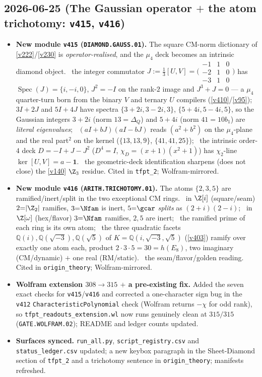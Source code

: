 \subsection*{2026-06-25 (The Gaussian operator $+$ the atom trichotomy: \texttt{v415}, \texttt{v416})}
\begin{itemize}
\item \textbf{New module \texttt{v415} (\texttt{DIAMOND.GAUSS.01}).} The square CM-norm dictionary of
\vref{v222}/\vref{v230} is \emph{operator-realised}, and the $\mu_4$ deck becomes an intrinsic diamond
object. \mE\ the integer commutator $J:=\tfrac13[U,V]=\big(\begin{smallmatrix}-1&1&0\\-2&1&0\\-3&1&0\end{smallmatrix}\big)$
has $\operatorname{Spec}(J)=\{i,-i,0\}$, $J^2=-I$ on the rank-$2$ image and $J^3+J=0$ --- a $\mu_4$
quarter-turn born from the binary $V$ and ternary $U$ compilers (\vref{v410}/\vref{v95}); \mE\ $3I+2J$ and
$5I+4J$ have spectra $\{3{+}2i,3{-}2i,3\}$, $\{5{+}4i,5{-}4i,5\}$, so the Gaussian integers $3{+}2i$ (norm
$13{=}\Delta_Q$) and $5{+}4i$ (norm $41{=}10b_1$) are \emph{literal eigenvalues}; \mE\ $(aI{+}bJ)(aI{-}bJ)$
reads $(a^2{+}b^2)$ on the $\mu_4$-plane and the real part$^2$ on the kernel ($\{13,13,9\}$, $\{41,41,25\}$);
\mE\ the intrinsic order-$4$ deck $D=-I+J-J^2$ ($D^4=I$, $\chi_D=(x{+}1)(x^2{+}1)$) has $\chi_2$-line
$\ker[U,V]=a-\mathbf 1$. \mC\ the geometric-deck identification sharpens (does not close) the \vref{v140}
$\Z_3$ residue. Cited in \texttt{tfpt\_2}; Wolfram-mirrored.
\item \textbf{New module \texttt{v416} (\texttt{ARITH.TRICHOTOMY.01}).} The atoms $\{2,3,5\}$ are
ramified/inert/split in the two exceptional CM rings. \mE\ in $\Z[i]$ (square/seam) $2{=}|\Z_2|$ ramifies,
$3{=}\Nfam$ is inert, $5{=}\gcar$ \emph{splits} as $(2{+}i)(2{-}i)$; \mE\ in $\Z[\omega]$ (hex/flavor)
$3{=}\Nfam$ ramifies, $2,5$ are inert; \mE\ the ramified prime of each ring is its own atom; \mE\ the three
quadratic facets $\mathbb Q(i),\mathbb Q(\sqrt{-3}),\mathbb Q(\sqrt5)$ of $K=\mathbb Q(i,\sqrt{-3},\sqrt5)$
(\vref{v403}) ramify over exactly one atom each, product $2\cdot3\cdot5=30=h(E_8)$, two imaginary
(CM/dynamic) $+$ one real (RM/static). \mC\ the seam/flavor/golden reading. Cited in
\texttt{origin\_theory}; Wolfram-mirrored.
\item \textbf{Wolfram extension $308\to315$ $+$ a pre-existing fix.} Added the seven exact checks for
\texttt{v415}/\texttt{v416} and corrected a one-character sign bug in the \texttt{v412}
\texttt{CharacteristicPolynomial} check (Wolfram returns $-\chi$ for odd rank), so
\texttt{tfpt\_readouts\_extension.wl} now runs genuinely clean at $315/315$ (\texttt{GATE.WOLFRAM.02});
README and ledger counts updated.
\item \textbf{Surfaces synced.} \texttt{run\_all.py}, \texttt{script\_registry.csv} and
\texttt{status\_ledger.csv} updated; a new keybox paragraph in the Sheet-Diamond section of \texttt{tfpt\_2}
and a trichotomy sentence in \texttt{origin\_theory}; manifests refreshed.
\end{itemize}

